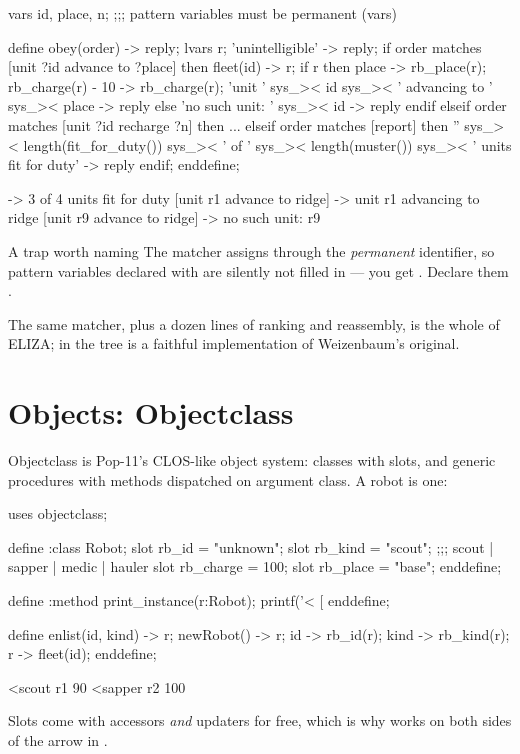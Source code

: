 \begin{pop}
vars id, place, n;            ;;; pattern variables must be permanent (vars)

define obey(order) -> reply;
    lvars r;
    'unintelligible' -> reply;
    if order matches [unit ?id advance to ?place] then
        fleet(id) -> r;
        if r then
            place -> rb_place(r);
            rb_charge(r) - 10 -> rb_charge(r);
            'unit ' sys_>< id sys_>< ' advancing to ' sys_>< place -> reply
        else 'no such unit: ' sys_>< id -> reply endif
    elseif order matches [unit ?id recharge ?n] then
        ...
    elseif order matches [report] then
        '' sys_>< length(fit_for_duty()) sys_>< ' of ' sys_><
        length(muster()) sys_>< ' units fit for duty' -> reply
    endif;
enddefine;
\end{pop}
\begin{repl}
[report]  ->  3 of 4 units fit for duty
[unit r1 advance to ridge]  ->  unit r1 advancing to ridge
[unit r9 advance to ridge]  ->  no such unit: r9
\end{repl}

\begin{callout}{A trap worth naming}
The matcher assigns through the \emph{permanent} identifier, so pattern
variables declared with  are silently not filled in --- you get
. Declare them .
\end{callout}

The same matcher, plus a dozen lines of ranking and reassembly, is the whole
of ELIZA;  in the tree is a faithful implementation of
Weizenbaum's original.

\section{Objects: Objectclass}

Objectclass is Pop-11's CLOS-like object system: classes with slots, and
generic procedures with methods dispatched on argument class. A robot is one:

\begin{pop}
uses objectclass;

define :class Robot;
    slot rb_id     = "unknown";
    slot rb_kind   = "scout";      ;;; scout | sapper | medic | hauler
    slot rb_charge = 100;
    slot rb_place  = "base";
enddefine;

define :method print_instance(r:Robot);
    printf('<%
           [%
enddefine;

define enlist(id, kind) -> r;
    newRobot() -> r;
    id -> rb_id(r);  kind -> rb_kind(r);
    r  -> fleet(id);
enddefine;
\end{pop}
\begin{repl}
<scout r1  90%
<sapper r2  100%
\end{repl}

Slots come with accessors \emph{and} updaters for free, which is why
 works on both sides of the arrow in .
